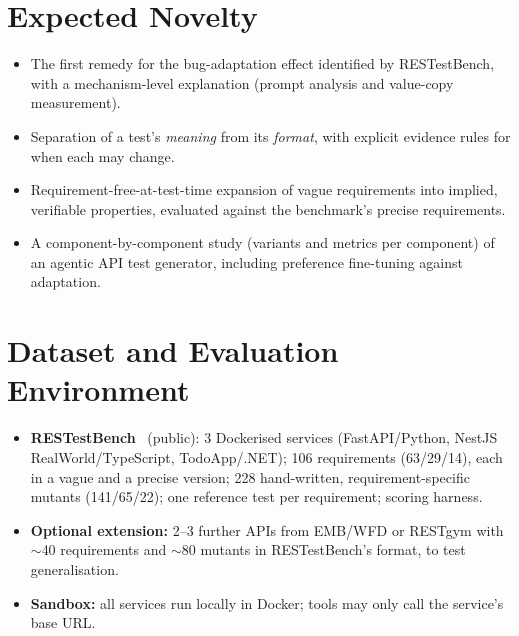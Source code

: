 \documentclass[11pt,a4paper]{article}
\begin{document}
\section{Expected Novelty}
\begin{itemize}
  \item The first remedy for the bug-adaptation effect identified by RESTestBench, with a mechanism-level explanation (prompt analysis and value-copy measurement).
  \item Separation of a test's \emph{meaning} from its \emph{format}, with explicit evidence rules for when each may change.
  \item Requirement-free-at-test-time expansion of vague requirements into implied, verifiable properties, evaluated against the benchmark's precise requirements.
  \item A component-by-component study (variants and metrics per component) of an agentic API test generator, including preference fine-tuning against adaptation.
\end{itemize}

\section{Dataset and Evaluation Environment}
\begin{itemize}
  \item \textbf{RESTestBench}~\cite{restestbench} (public): 3 Dockerised services (FastAPI/Python, NestJS RealWorld/TypeScript, TodoApp/.NET); 106 requirements (63/29/14), each in a vague and a precise version; 228 hand-written, requirement-specific mutants (141/65/22); one reference test per requirement; scoring harness.
  \item \textbf{Optional extension:} 2--3 further APIs from EMB/WFD or RESTgym with $\sim$40 requirements and $\sim$80 mutants in RESTestBench's format, to test generalisation.
  \item \textbf{Sandbox:} all services run locally in Docker; tools may only call the service's base URL.
\end{itemize}

\end{document}
